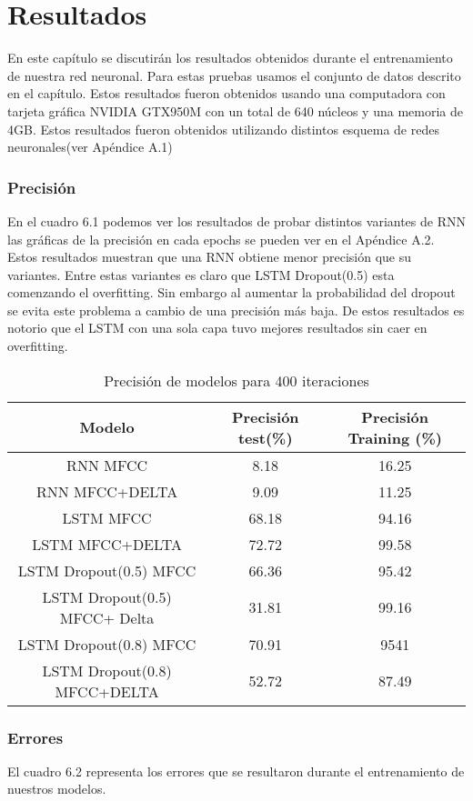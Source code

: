 \chapter{Resultados}
En este capítulo se discutirán los resultados obtenidos durante el entrenamiento de nuestra red neuronal.
Para estas pruebas usamos el conjunto de datos descrito en el capítulo. Estos resultados fueron
obtenidos usando una computadora con tarjeta gráfica NVIDIA GTX950M con
un total de 640 núcleos y una memoria de 4GB.
Estos resultados fueron obtenidos utilizando distintos esquema de redes neuronales(ver Apéndice A.1)
\subsection{Precisión}
En el cuadro 6.1 podemos ver los resultados de probar distintos variantes de RNN las gráficas de la precisión en cada epochs se pueden ver en el Apéndice A.2. Estos resultados muestran que una RNN obtiene menor precisión que su variantes. Entre estas variantes es claro que LSTM Dropout(0.5) esta comenzando el overfitting. Sin embargo al aumentar la probabilidad del dropout se evita este problema a cambio de una precisión más baja. De estos resultados es notorio que el LSTM con una sola capa tuvo mejores resultados sin caer en overfitting.
\begin{table}[H]
	\centering
	\begin{tabular}{|c|c|c|}
		\hline
		\rowcolor{Gray}  Modelo & Precisión test(\%) & Precisión Training (\%)\\ \hline
		RNN MFCC&        8.18  &             16.25        \\ \hline
		RNN MFCC+DELTA&    9.09  &             11.25       \\ \hline
		LSTM MFCC&        68.18  &          94.16         \\ \hline
		LSTM MFCC+DELTA&  72.72  &             99.58       \\ \hline
		LSTM Dropout(0.5) MFCC&  66.36         &     95.42           \\ \hline
		LSTM Dropout(0.5) MFCC+ Delta &31.81 &99.16 \\\hline
		LSTM Dropout(0.8) MFCC&	70.91		&	9541		\\ \hline
		LSTM Dropout(0.8) MFCC+DELTA&	52.72		&	87.49	\\ \hline
	\end{tabular}
	\caption{Precisión de modelos para 400 iteraciones}
\end{table}
\subsection{Errores }
El cuadro 6.2 representa los errores que se resultaron durante el entrenamiento de nuestros modelos.


